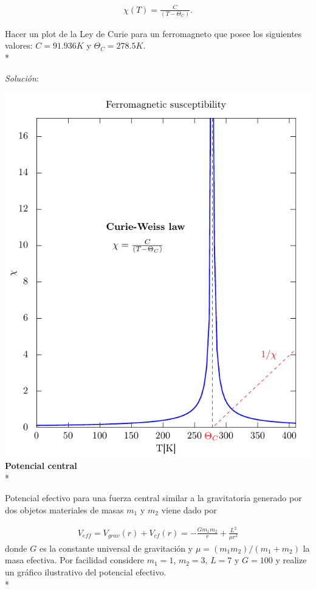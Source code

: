\documentclass[11.5pt,a4paper]{article}
\begin{document}
\begin{eqnarray*}
\chi(T) = \frac{C}{(T-\Theta_{C})}.
\end{eqnarray*}

Hacer un plot de la Ley de Curie para un ferromagneto que posee los siguientes valores: $C = 91.936 K$ y $\Theta_{C} = 278.5 K$.\\*

\textit{Solución}:

\includegraphics[scale=0.60]{ejercicio1.pdf}\\

\textbf{Potencial central}\\*

Potencial efectivo para una fuerza central similar a la gravitatoria generado por dos objetos materiales de masas $m_1$ y $m_2$ viene dado por

\begin{eqnarray*}
V_{eff} = V_{grav}(r)+V_{cf}(r)=-\frac{G m_1 m_2}{r}+\frac{L^2}{\mu r^2}
\end{eqnarray*}
donde $G$ es la constante universal de gravitación y $\mu = (m_1 m_2)/(m_1+m_2)$ la masa efectiva. Por facilidad considere $m_1=1$, $m_2=3$, $L=7$ y $G=100$ y realize un gráfico ilustrativo del potencial efectivo.\\*
\end{document}

